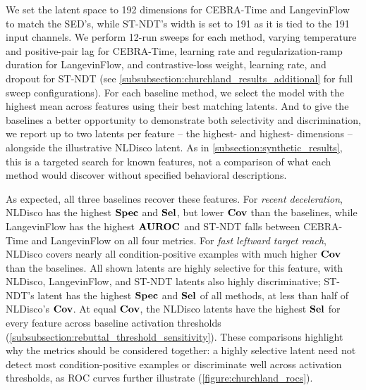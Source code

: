 We set the latent space to 192 dimensions for CEBRA-Time and LangevinFlow to match the SED's, while ST-NDT's width is set to 191 as it is tied to the 191 input channels. We perform 12-run sweeps for each method, varying temperature and positive-pair lag for CEBRA-Time, learning rate and regularization-ramp duration for LangevinFlow, and contrastive-loss weight, learning rate, and dropout for ST-NDT (see \hyperref[subsubsection:churchland_results_additional]{\ref*{subsubsection:churchland_results_additional}} for full sweep configurations). For each baseline method, we select the model with the highest mean  across features using their best matching latents. And to give the baselines a better opportunity to demonstrate both selectivity and discrimination, we report up to two latents per feature -- the highest- and highest- dimensions -- alongside the illustrative NLDisco latent. As in \hyperref[subsection:synthetic_results]{\ref*{subsection:synthetic_results}}, this is a targeted search for known features, not a comparison of what each method would discover without specified behavioral descriptions.

As expected, all three baselines recover these features. For \textit{recent deceleration}, NLDisco has the highest $\mathbf{Spec}$ and $\mathbf{Sel}$, but lower $\mathbf{Cov}$ than the baselines, while LangevinFlow has the highest $\mathbf{AUROC}$ and ST-NDT falls between CEBRA-Time and LangevinFlow on all four metrics. For \textit{fast leftward target reach}, NLDisco covers nearly all condition-positive examples with much higher $\mathbf{Cov}$ than the baselines. All shown latents are highly selective for this feature, with NLDisco, LangevinFlow, and ST-NDT latents also highly discriminative; ST-NDT's latent has the highest $\mathbf{Spec}$ and $\mathbf{Sel}$ of all methods, at less than half of NLDisco's $\mathbf{Cov}$. At equal $\mathbf{Cov}$, the NLDisco latents have the highest $\mathbf{Sel}$ for every feature across baseline activation thresholds (\hyperref[subsubsection:rebuttal_threshold_sensitivity]{\ref*{subsubsection:rebuttal_threshold_sensitivity}}). These comparisons highlight why the metrics should be considered together: a highly selective latent need not detect most condition-positive examples or discriminate well across activation thresholds, as ROC curves further illustrate (\autoref{figure:churchland_rocs}).


